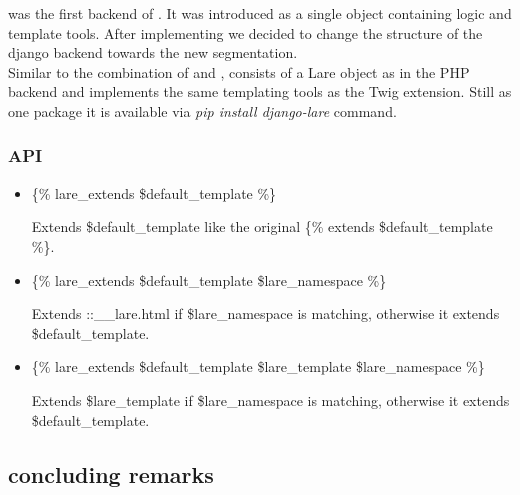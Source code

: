 \djangoLare{} was the first backend of \lare{}.
It was introduced as a single object containing logic and template tools.
After implementing \phpLare{} we decided to change the structure of the django backend towards the new segmentation.
\\
Similar to the combination of \phpLare{} and \twigLare{}, \djangoLare{} consists of a Lare object as in the PHP backend and implements the same templating tools as the Twig extension.
Still as one package it is available via \emph{pip install django-lare} command.


\subsubsection{API}

\begin{itemize}
\item \{\% lare\_extends \$default\_template \%\}

Extends \$default\_template like the original \{\% extends \$default\_template \%\}.
\item \{\% lare\_extends \$default\_template \$lare\_namespace \%\}

Extends ::\_\_lare.html if \$lare\_namespace is matching, otherwise it extends \$default\_template.
\item \{\% lare\_extends \$default\_template \$lare\_template \$lare\_namespace \%\}

Extends \$lare\_template if \$lare\_namespace is matching, otherwise it extends \$default\_template.
\end{itemize}


\subsection{\lareJS{}}


\subsection{concluding remarks}
